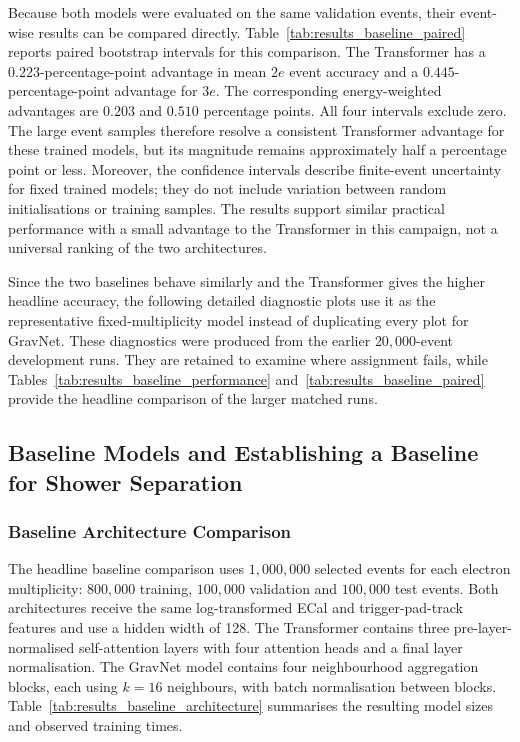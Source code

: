 

Because both models were evaluated on the same validation events, their
event-wise results can be compared directly. Table~\ref{tab:results_baseline_paired}
reports paired bootstrap intervals for this comparison. The Transformer has a
\(0.223\)-percentage-point advantage in mean \(2e\) event accuracy and a
\(0.445\)-percentage-point advantage for \(3e\). The corresponding
energy-weighted advantages are \(0.203\) and \(0.510\) percentage points. All
four intervals exclude zero. The large event samples therefore resolve a
consistent Transformer advantage for these trained models, but its magnitude
remains approximately half a percentage point or less. Moreover, the
confidence intervals describe finite-event uncertainty for fixed trained
models; they do not include variation between random initialisations or
training samples. The results support similar practical performance with a
small advantage to the Transformer in this campaign, not a universal ranking
of the two architectures.



Since the two baselines behave similarly and the Transformer gives the higher
headline accuracy, the following detailed diagnostic plots use it as the
representative fixed-multiplicity model instead of duplicating every plot for
GravNet. These diagnostics were produced from the earlier
\(20{,}000\)-event development runs. They are retained to examine where
assignment fails, while Tables~\ref{tab:results_baseline_performance}
and~\ref{tab:results_baseline_paired} provide the headline comparison of the
larger matched runs.





\subsection{Baseline Models and Establishing a Baseline for Shower Separation}

\subsubsection{Baseline Architecture Comparison}

The headline baseline comparison uses \(1{,}000{,}000\) selected events for
each electron multiplicity: \(800{,}000\) training, \(100{,}000\) validation
and \(100{,}000\) test events.
Both architectures receive the same log-transformed ECal and trigger-pad-track
features and use a hidden width of 128. The Transformer contains three
pre-layer-normalised self-attention layers with four attention heads and a
final layer normalisation. The GravNet model contains four neighbourhood
aggregation blocks, each using \(k=16\) neighbours, with batch normalisation
between blocks. Table~\ref{tab:results_baseline_architecture} summarises the
resulting model sizes and observed training times.

